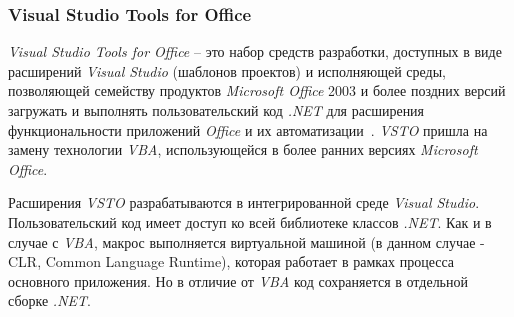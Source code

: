 \subsubsection{Visual Studio Tools for Office}

{\it Visual Studio Tools for Office} -- это набор средств разработки, доступных в виде расширений {\it Visual Studio} (шаблонов проектов) и исполняющей среды, позволяющей  семейству продуктов {\it Microsoft Office} 2003 и более поздних версий загружать и выполнять пользовательский код {\it .NET} для расширения функциональности приложений {\it Office} и их автоматизации~\cite{vsto-website}. {\it VSTO} пришла на замену технологии {\it VBA}, использующейся в более ранних версиях {\it Microsoft Office}. 

Расширения {\it VSTO} разрабатываются в интегрированной среде {\it Visual Studio}. Пользовательский код имеет доступ ко всей библиотеке классов {\it .NET}. Как и в случае с {\it VBA}, макрос выполняется виртуальной машиной (в данном случае - CLR, Common Language Runtime), которая работает в рамках процесса основного приложения. Но в отличие от {\it VBA} код сохраняется в отдельной сборке {\it .NET}.
